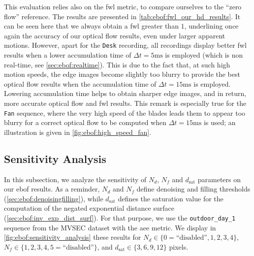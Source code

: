 This evaluation relies also on the \acrshort{fwl} metric, to compare ourselves to the ``zero flow'' reference. The results are presented in \cref{tab:ebof:fwl_our_hd_results}. It can be seen here that we always obtain a \acrshort{fwl} greater than \(1\), underlining once again the accuracy of our optical flow results, even under larger apparent motions. However, apart for the \verb|Desk| recording, all recordings display better \acrshort{fwl} results when a lower accumulation time of \(\Delta t = 5\text{ms}\) is employed (which is non real-time, see \cref{sec:ebof:realtime}). This is due to the fact that, at such high motion speeds, the edge images become slightly too blurry to provide the best optical flow results when the accumulation time of \(\Delta t = 15\text{ms}\) is employed. Lowering accumulation time helps to obtain sharper edge images, and in return, more accurate optical flow and \acrshort{fwl} results. This remark is especially true for the \verb|Fan| sequence, where the very high speed of the blades leads them to appear too blurry for a correct optical flow to be computed when \(\Delta t = 15\text{ms}\) is used; an illustration is given in \cref{fig:ebof:high_speed_fan}.

\subsection{Sensitivity Analysis}\label{sec:ebof:sensitivity}
In this subsection, we analyze the sensitivity of \(N_d\), \(N_f\) and \(d_\text{sat}\) parameters on our \acrshort{ebof} results. As a reminder, \(N_d\) and \(N_f\) define denoising and filling thresholds (\cref{sec:ebof:denoisingfilling}), while \(d_\text{sat}\) defines the saturation value for the computation of the negated exponential distance surface (\cref{sec:ebof:inv_exp_dist_surf}). For that purpose, we use the \verb|outdoor_day_1| sequence from the MVSEC dataset with the \acrshort{aee} metric. We display in \cref{fig:ebof:sensitivity_analysis} these results for \(N_d \in \{0=\text{``disabled''}, 1, 2, 3, 4\}\), \(N_f \in \{1, 2, 3, 4, 5=\text{``disabled''}\}\), and \(d_\text{sat} \in \{3, 6, 9, 12\}\) pixels.

